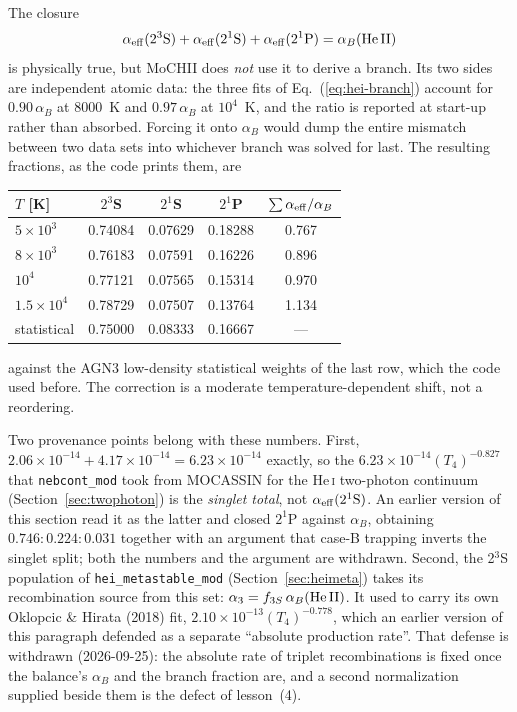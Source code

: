 \documentclass[english,a4paper]{my_memo}
\newcommand{\code}[1]{\texttt{#1}}
\begin{document}
The closure
\begin{equation}
 \alpha_{\rm eff}(2^3{\rm S}) + \alpha_{\rm eff}(2^1{\rm S})
   + \alpha_{\rm eff}(2^1{\rm P}) = \alpha_B({\rm He\,II})
 \label{eq:hei-closure}
\end{equation}
is physically true, but MoCHII does \emph{not} use it to derive a branch.
Its two sides are independent atomic data: the three fits of
Eq.~(\ref{eq:hei-branch}) account for $0.90\,\alpha_B$ at 8000~K and
$0.97\,\alpha_B$ at $10^4$~K, and the ratio is reported at start-up rather
than absorbed.  Forcing it onto $\alpha_B$ would dump the entire mismatch
between two data sets into whichever branch was solved for last.  The
resulting fractions, as the code prints them, are
\begin{center}
\begin{tabular}{lcccc}
\toprule
$T$ [K] & $2^3$S & $2^1$S & $2^1$P & $\sum\alpha_{\rm eff}/\alpha_B$ \\
\midrule
$5{\times}10^3$   & 0.74084 & 0.07629 & 0.18288 & 0.767 \\
$8{\times}10^3$   & 0.76183 & 0.07591 & 0.16226 & 0.896 \\
$10^4$            & 0.77121 & 0.07565 & 0.15314 & 0.970 \\
$1.5{\times}10^4$ & 0.78729 & 0.07507 & 0.13764 & 1.134 \\
\midrule
statistical & 0.75000 & 0.08333 & 0.16667 & --- \\
\bottomrule
\end{tabular}
\end{center}
against the AGN3 low-density statistical weights of the last row, which the
code used before.  The correction is a moderate temperature-dependent shift,
not a reordering.

Two provenance points belong with these numbers.  First,
$2.06{\times}10^{-14} + 4.17{\times}10^{-14} = 6.23{\times}10^{-14}$
exactly, so the $6.23{\times}10^{-14}(T_4)^{-0.827}$ that \code{nebcont\_mod}
took from MOCASSIN for the He\,\textsc{i} two-photon continuum
(Section~\ref{sec:twophoton}) is the \emph{singlet total}, not
$\alpha_{\rm eff}(2^1{\rm S})$.  An earlier version of this section read it
as the latter and closed $2^1$P against $\alpha_B$, obtaining
$0.746 : 0.224 : 0.031$ together with an argument that case-B trapping
inverts the singlet split; both the numbers and the argument are withdrawn.
Second, the 2$^3$S population of \code{hei\_metastable\_mod}
(Section~\ref{sec:heimeta}) takes its recombination source from this set:
$\alpha_3 = f_{3S}\,\alpha_B({\rm He\,II})$.  It used to carry its own
Oklopcic \& Hirata (2018) fit, $2.10{\times}10^{-13}(T_4)^{-0.778}$, which an
earlier version of this paragraph defended as a separate ``absolute
production rate''.  That defense is withdrawn (2026-09-25): the absolute rate
of triplet recombinations is fixed once the balance's $\alpha_B$ and the
branch fraction are, and a second normalization supplied beside them is the
defect of lesson~(4).
\end{document}
